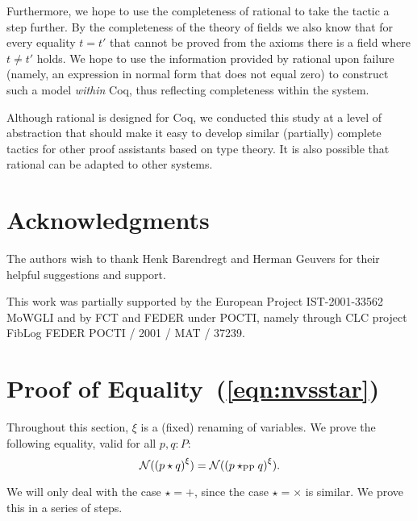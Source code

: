 \documentclass{article}
\newcommand{\N}{{\cal N}}
\newcommand{\tacticname}[1]{\textsf{#1}}
\newcommand{\rational}{\tacticname{rational}}
\newcommand{\renamevar}[2]{\ensuremath{{#1}^{#2}}}
\newcommand{\starPP}{\ensuremath{\star_{\mathrm{PP}}}}
\begin{document}
Furthermore, we hope to use the completeness of {\rational} to take the
tactic a step further.  By the completeness of the theory of fields we
also know that for every equality $t=t'$ that cannot be proved from the
axioms there is a field where $t\neq t'$ holds.  We hope to use the
information provided by {\rational} upon failure (namely, an expression
in normal form that does not equal zero) to construct such a model
\emph{within} Coq, thus reflecting completeness within the system.

Although {\rational} is designed for Coq, we conducted this study at a
level of abstraction that should make it easy to develop similar
(partially) complete tactics for other proof assistants based on type
theory.  It is also possible that {\rational} can be adapted to other
systems.

\section*{Acknowledgments}

The authors wish to thank Henk Barendregt and Herman Geuvers for their
helpful suggestions and support.

This work was partially supported by the European Project 
IST-2001-33562 MoWGLI
and by FCT and FEDER under POCTI, namely through CLC project FibLog
FEDER POCTI / 2001 / MAT / 37239.




\appendix

\section{Proof of Equality~(\ref{eqn:nvsstar})}

Throughout this section, $\xi$ is a (fixed) renaming of variables.
We prove the following equality, valid for all $p,q:P$:
\[\N(\renamevar{(p\star q)}\xi)=\N(\renamevar{(p\starPP q)}\xi).\]

We will only deal with the case $\star=+$, since the case $\star=\times$
is similar.  We prove this in a series of steps.
\end{document}
